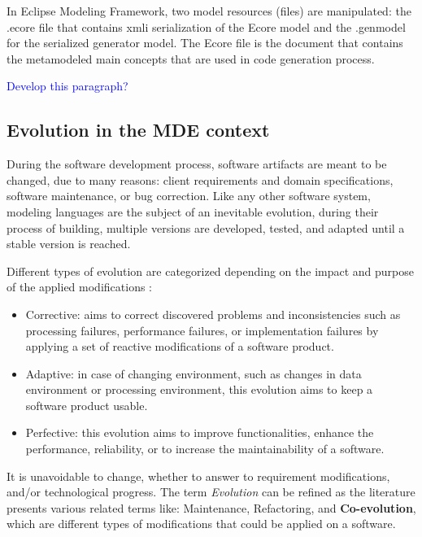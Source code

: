 In Eclipse Modeling Framework, two model resources (files) are manipulated: the .ecore file that contains  xmli serialization of the Ecore model and the .genmodel for the serialized generator model. The Ecore file is the document that contains the metamodeled main concepts that are used in code generation process.

\textcolor{blue}{Develop this paragraph?}
\subsection{Evolution in the MDE context}

During the software development process, software artifacts are meant to be changed, due to many reasons: client requirements and domain specifications, software maintenance, or bug correction. Like any other software system, modeling languages are the subject of an inevitable evolution, during their process of building, multiple versions are developed, tested, and adapted until a stable version is reached. 

Different types of evolution are categorized depending on the impact and purpose of the applied modifications \cite{lientz1980software,Swanson1976}:
\begin{itemize}
	
	\item  Corrective: aims to correct discovered problems and inconsistencies such as processing failures, performance failures, or implementation failures by applying  a set of reactive modifications of a software product.  
	
	\item  Adaptive: in case of changing environment, such as changes in data environment or processing environment, this evolution aims to keep a software product usable.
	
	\item Perfective: this evolution aims to improve functionalities, enhance the performance, reliability, or to increase the maintainability of a software.  
	
\end{itemize}
It is unavoidable to change, whether to answer to requirement modifications, and/or technological progress.
The term \textit{Evolution} can be refined as the literature presents various related terms like: Maintenance, Refactoring, and \textbf{Co-evolution}, which are different types of modifications that could be applied on a software.


